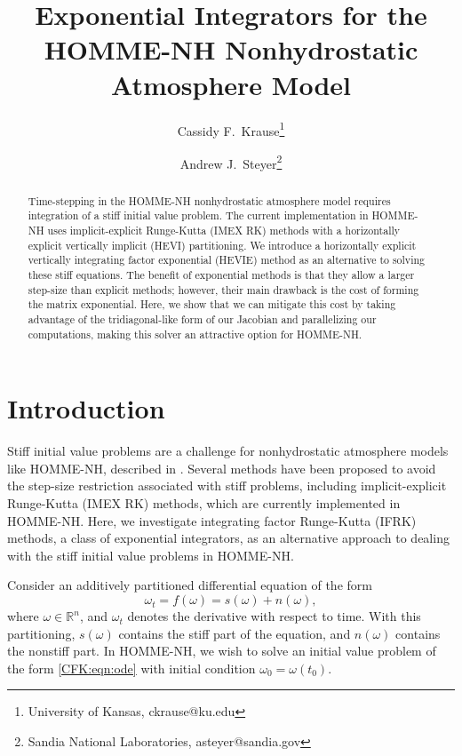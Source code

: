 \documentclass{csri19}
\title{Exponential Integrators for the HOMME-NH Nonhydrostatic Atmosphere
 Model}
\author{Cassidy F.\ Krause\thanks{University of Kansas, ckrause@ku.edu}
\and Andrew J.\ Steyer\thanks{Sandia National Laboratories, 
  asteyer@sandia.gov}}
\begin{document}
\maketitle

\begin{abstract}
Time-stepping in the HOMME-NH nonhydrostatic atmosphere model requires 
integration of a stiff initial value problem. The current implementation in 
HOMME-NH uses implicit-explicit Runge-Kutta (IMEX RK) methods with a 
horizontally explicit vertically implicit (HEVI) partitioning. We introduce 
a horizontally explicit vertically integrating factor exponential (HEVIE) 
method as an alternative to solving these stiff equations. The benefit of 
exponential methods is that they allow a larger step-size than explicit 
methods; however, their main drawback is the cost of forming the matrix 
exponential. Here, we show that we can mitigate this cost by taking 
advantage of the tridiagonal-like form of our Jacobian and parallelizing 
our computations, making this solver an attractive option for HOMME-NH.
\end{abstract}

\section{Introduction} \label{CFK:sec:intro}
Stiff initial value problems are a challenge for nonhydrostatic 
atmosphere models like HOMME-NH, described in \cite{CFK:preprint}. Several 
methods have been proposed to avoid the step-size restriction associated 
with stiff problems, including implicit-explicit Runge-Kutta (IMEX RK) 
methods, which are currently implemented in HOMME-NH. Here, we investigate 
integrating factor Runge-Kutta (IFRK) methods, a class of exponential 
integrators, as an alternative approach to dealing with the stiff initial 
value problems in HOMME-NH.

Consider an additively partitioned differential equation of the form 
\begin{equation}\label{CFK:eqn:ode} 
\omega_t = f(\omega) = s(\omega) + n(\omega),\end{equation} where 
$\omega \in \mathbb{R}^n$, and $\omega_t$ denotes the derivative with 
respect to time. With this partitioning, $s(\omega)$ contains the stiff 
part of the equation, and $n(\omega)$ contains the nonstiff part. In 
HOMME-NH, we wish to solve an initial value problem of the form 
\ref{CFK:eqn:ode} with initial condition $\omega_0 = \omega(t_0)$. 
\end{document}
